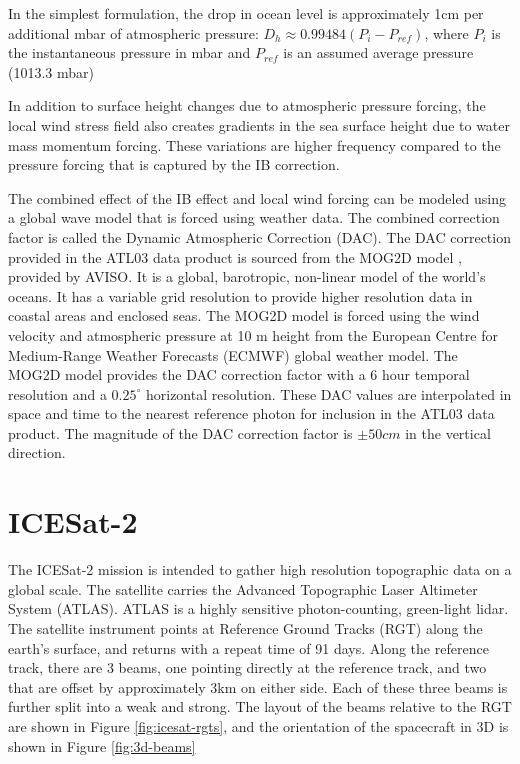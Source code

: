 In the simplest formulation, the drop in ocean level is approximately 1cm per additional mbar of atmospheric pressure: $D_h \approx 0.99484(P_i-P_{ref})$, where $P_i$ is the instantaneous pressure in mbar and $P_{ref}$ is an assumed average pressure (1013.3 mbar) \parencite{Neumann2019e}

In addition to surface height changes due to atmospheric pressure forcing, the local wind stress field also creates gradients in the sea surface height due to water mass momentum forcing. These variations are higher frequency compared to the pressure forcing that is captured by the IB correction.

The combined effect of the IB effect and local wind forcing can be modeled using a global wave model that is forced using weather data. The combined correction factor is called the Dynamic Atmospheric Correction (DAC). The DAC correction provided in the ATL03 data product is sourced from the MOG2D model \parencite{LeProvost1994}, provided by AVISO. It is a global, barotropic, non-linear model of the world's oceans. It has a variable grid resolution to provide higher resolution data in coastal areas and enclosed seas. The MOG2D model is forced using the wind velocity and atmospheric pressure at 10 m height from the European Centre for Medium-Range Weather Forecasts (ECMWF) global weather model. The MOG2D model provides the DAC correction factor with a 6 hour temporal resolution and a $0.25^{\circ}$ horizontal resolution. These DAC values are interpolated in space and time to the nearest reference photon for inclusion in the ATL03 data product. The magnitude of the DAC correction factor is $\pm 50 cm$ in the vertical direction.


\section{ICESat-2}

The ICESat-2 mission is intended to gather high resolution topographic data on a global scale. The satellite carries the Advanced Topographic Laser Altimeter System (ATLAS). ATLAS is a highly sensitive photon-counting, green-light lidar. The satellite instrument points at Reference Ground Tracks (RGT) along the earth's surface, and returns with a repeat time of 91 days. Along the reference track, there are 3 beams, one pointing directly at the reference track, and two that are offset by approximately 3km on either side. Each of these three beams is further split into a weak and strong. The layout of the beams relative to the RGT are shown in Figure \ref{fig:icesat-rgts}, and the orientation of the spacecraft in 3D is shown in Figure \ref{fig:3d-beams}


